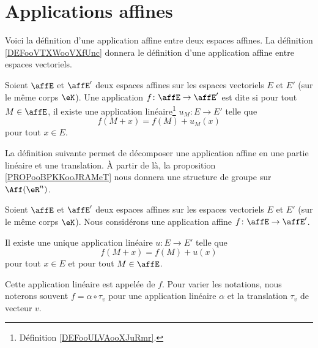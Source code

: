 \section{Applications affines}

Voici la définition d'une application affine entre deux espaces affines. La définition \ref{DEFooVTXWooVXfUnc} donnera le définition d'une application affine entre espaces vectoriels.

\begin{definition}      \label{DEFooUAWZooXcMKve}
	Soient \( \affE\) et \( \affE'\) deux espaces affines sur les espaces vectoriels \( E\) et \( E'\) (sur le même corps \( \eK\)). Une application \( f\colon \affE\to \affE'\) est dite  si pour tout \( M\in \affE\), il existe une application linéaire\footnote{Définition \ref{DEFooULVAooXJuRmr}.} \( u_M\colon E\to E'\) telle que
	\begin{equation}    \label{EqMqIoWX}
		f(M+x)=f(M)+u_M(x)
	\end{equation}
	pour tout \( x\in E\).
\end{definition}

La définition suivante permet de décomposer une application affine en une partie linéaire et une translation. À partir de là, la proposition \ref{PROPooBPKKooJRAMeT} nous donnera une structure de groupe sur \( \Aff(\eR^n)\).

\begin{lemmaDef}       \label{LEMooYJCDooOGAHkF}
	Soient \( \affE\) et \( \affE'\) deux espaces affines sur les espaces vectoriels \( E\) et \( E'\) (sur le même corps \( \eK\)). Nous considérons une application affine \( f\colon \affE\to \affE'\).

	Il existe une unique application linéaire \( u\colon E\to E'\) telle que
	\begin{equation}
		f(M+x)=f(M)+u(x)
	\end{equation}
	pour tout \( x\in E\) et pour tout \( M\in \affE\).

	Cette application linéaire est appelée  de \( f\). Pour varier les notations, nous noterons souvent \( f=\alpha\circ\tau_v\) pour une application linéaire \( \alpha\) et la translation \( \tau_v\) de vecteur \( v\).
\end{lemmaDef}

